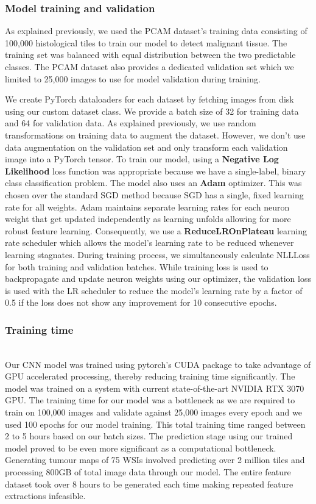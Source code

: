 \documentclass{l4proj}
\begin{document}
\subsubsection{Model training and validation}
As explained previously, we used the PCAM dataset's training data consisting of 100,000 histological tiles to train our model to detect malignant tissue. The training set was balanced with equal distribution between the two predictable classes. The PCAM dataset also provides a dedicated validation set which we limited to 25,000 images to use for model validation during training. 

We create PyTorch dataloaders for each dataset by fetching images from disk using our custom dataset class. We provide a batch size of 32 for training data and 64 for validation data. As explained previously, we use random transformations on training data to augment the dataset. However, we don't use data augmentation on the validation set and only transform each validation image into a PyTorch tensor. To train our model, using a \textbf{Negative Log Likelihood} loss function was appropriate because we have a single-label, binary class classification problem. The model also uses an \textbf{Adam} optimizer. This was chosen over the standard SGD method because SGD has a single, fixed learning rate for all weights. Adam maintains separate learning rates for each neuron weight that get updated independently as learning unfolds allowing for more robust feature learning. Consequently, we use a \textbf{ReduceLROnPlateau} learning rate scheduler which allows the model's learning rate to be reduced whenever learning stagnates. During training process, we simultaneously calculate NLLLoss for both training and validation batches. While training loss is used to backpropagate and update neuron weights using our optimizer, the validation loss is used with the LR scheduler to reduce the model's learning rate by a factor of 0.5 if the loss does not show any improvement for 10 consecutive epochs. 
\\
\subsubsection{Training time}\hfill\\
Our CNN model was trained using pytorch's CUDA package to take advantage of GPU accelerated processing, thereby reducing training time significantly. The model was trained on a system with current state-of-the-art NVIDIA RTX 3070 GPU. The training time for our model was a bottleneck as we are required to train on 100,000 images and validate against 25,000 images every epoch and we used 100 epochs for our model training. This total training time ranged between 2 to 5 hours based on our batch sizes.
The prediction stage using our trained model proved to be even more significant as a computational bottleneck. Generating tumour maps of 75 WSIs involved predicting over 2 million tiles and processing 800GB of total image data through our model. The entire feature dataset took over 8 hours to be generated each time making repeated feature extractions infeasible.
\\
\end{document}
